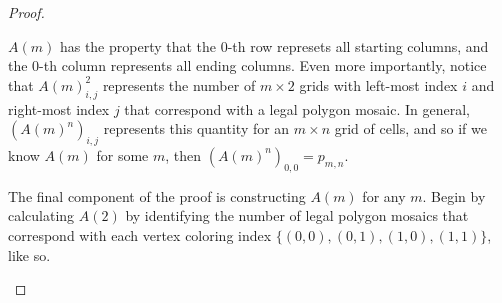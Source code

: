 \begin{proof}
\begin{center}
\end{center}

$A(m)$ has the property that the $0$-th row represets all starting columns, and the $0$-th column represents all ending columns. Even more importantly, notice that $A(m)^2_{i,j}$ represents the number of $m \times 2$ grids with left-most index $i$ and right-most index $j$ that correspond with a legal polygon mosaic. In general, $(A(m)^n)_{i,j}$ represents this quantity for an $m \times n$ grid of cells, and so if we know $A(m)$ for some $m$, then $(A(m)^n)_{0,0} = p_{m,n}.$

The final component of the proof is constructing $A(m)$ for any $m$. Begin by  calculating $A(2)$ by identifying the number of legal polygon mosaics that correspond with each vertex coloring index $\{(0,0),(0,1),(1,0),(1,1)\}$, like so.

\begin{center}
\end{center}
\end{proof}

